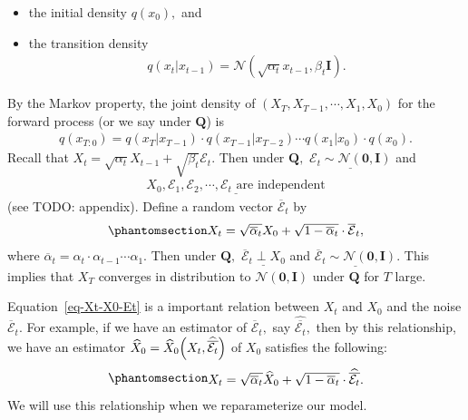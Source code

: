\documentclass[
]{article}
\providecommand{\tightlist}{%
  \setlength{\itemsep}{0pt}\setlength{\parskip}{0pt}}\usepackage{longtable,booktabs,array}
\theoremstyle{remark}
\begin{document}
\begin{itemize}
\tightlist
\item
  the initial density \(q(x_0),\) and
\item
  the transition density \[
  \begin{aligned}
    q(x_t\vert x_{t-1}) = \mathcal{N} (\sqrt{\alpha_t}x_{t-1},\beta_t \mathbf{I}).
  \end{aligned}
  \]
\end{itemize}

By the Markov property, the joint density of
\((X_T, X_{T-1},\cdots, X_1, X_0)\) for the forward process (or we say
under \(\mathbf{Q}\)) is \[
\begin{aligned}
  q(x_{T:0}) = q(x_T\vert x_{T-1}) \cdot q(x_{T-1}\vert x_{T-2}) \cdots q(x_{1}\vert x_0) \cdot q(x_0).
\end{aligned}
\] Recall that
\(X_t = \sqrt{\alpha_{t}}X_{t-1} + \sqrt{\beta_t}\mathcal{E}_t.\) Then
under \(\mathbf{Q},\)
\(\underline{\mathcal{E}_t\sim \mathcal{N}(\mathbf{0},\mathbf{I})}\) and
\[
\begin{aligned}
  \underline{X_0,\mathcal{E}_1,\mathcal{E}_2,\cdots,\mathcal{E}_t\text{ are independent}}
\end{aligned}
\] (see TODO: appendix). Define a random vector
\(\overline{\mathcal{E}}_t\) by
\begin{equation}\phantomsection\label{eq-Xt-X0-Et}{
\begin{aligned}
  X_t = \sqrt{\overline{\alpha}_t}X_0 + \sqrt{1-\overline{\alpha}_t} \cdot \overline{\mathcal{E}}_t,
\end{aligned}
}\end{equation} where
\(\overline{\alpha}_t = \alpha_t\cdot \alpha_{t-1}\cdots \alpha_1.\)
Then under \(\mathbf{Q},\)
\(\underline{\overline{\mathcal{E}}_t\perp X_0}\) and
\(\underline{\overline{\mathcal{E}}_t\sim \mathcal{N}(\mathbf{0},\mathbf{I})}.\)
This implies that \(X_T\) converges in distribution to
\(\mathcal{N}(\mathbf{0},\mathbf{I})\) under \(\mathbf{Q}\) for \(T\)
large.

Equation~\ref{eq-Xt-X0-Et} is a important relation between \(X_t\) and
\(X_0\) and the noise \(\overline{\mathcal{E}}_t.\) For example, if we
have an estimator of \(\overline{\mathcal{E}}_t,\) say
\(\widehat{\overline{\mathcal{E}_t}},\) then by this relationship, we
have an estimator
\(\widehat{X}_0 = \widehat{X}_0\Bigl(X_t,\widehat{\overline{\mathcal{E}_t}}\Bigr)\)
of \(X_0\) satisfies the following:
\begin{equation}\phantomsection\label{eq-estimator-X0}{
\begin{aligned}
  X_t = \sqrt{\overline{\alpha}_t} \widehat{X}_0 + \sqrt{1-\overline{\alpha}_t} \cdot \widehat{\overline{\mathcal{E}_t}}.
\end{aligned}
}\end{equation} We will use this relationship when we reparameterize our
model.
\end{document}
